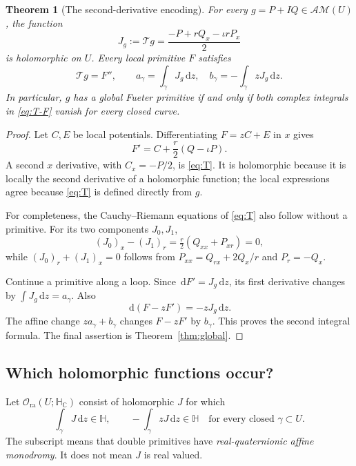 \documentclass[11pt,a4paper]{article}
\numberwithin{equation}{section}
\newtheorem{theorem}{Theorem}[section]
\theoremstyle{definition}
\theoremstyle{remark}
\newcommand{\C}{\mathbb C}
\newcommand{\HH}{\mathbb H}
\newcommand{\HC}{\mathbb H_{\C}}
\newcommand{\AM}{\mathcal{AM}}
\newcommand{\Hol}{\mathcal O}
\newcommand{\dd}{\,\mathrm d}
\newcommand{\T}{\mathcal T}
\begin{document}
\begin{theorem}[The second-derivative encoding]\label{thm:T}
For every $g=P+IQ\in\AM(U)$, the function
\begin{equation}\label{eq:T}
 J_g:=\T g=\frac{-P+rQ_x-\iota rP_x}{2}
\end{equation}
is holomorphic on $U$. Every local primitive $F$ satisfies
\begin{equation}\label{eq:T-F}
 \T g=F'',\qquad
 a_\gamma=\int_\gamma J_g\dd z,\quad
 b_\gamma=-\int_\gamma zJ_g\dd z.
\end{equation}
In particular, $g$ has a global Fueter primitive if and only if both
complex integrals in \eqref{eq:T-F} vanish for every closed curve.
\end{theorem}
\begin{proof}
Let $C,E$ be local potentials. Differentiating $F=zC+E$ in $x$ gives
\begin{equation}\label{eq:Fprime}
 F'=C+\frac r2(Q-\iota P).
\end{equation}
A second $x$ derivative, with $C_x=-P/2$, is \eqref{eq:T}.
It is holomorphic because it is locally the second derivative of a
holomorphic function; the local expressions agree because
\eqref{eq:T} is defined directly from $g$.

For completeness, the Cauchy--Riemann equations of \eqref{eq:T} also
follow without a primitive. For its two components $J_0,J_1$,
\[
 (J_0)_x-(J_1)_r=\tfrac r2(Q_{xx}+P_{xr})=0,
\]
while $(J_0)_r+(J_1)_x=0$ follows from
$P_{xx}=Q_{rx}+2Q_x/r$ and $P_r=-Q_x$.

Continue a primitive along a loop. Since $\dd F'=J_g\dd z$, its first
derivative changes by $\int J_g\dd z=a_\gamma$. Also
\[
 \dd(F-zF')=-zJ_g\dd z.
\]
The affine change $za_\gamma+b_\gamma$ changes $F-zF'$ by $b_\gamma$.
This proves the second integral formula. The final assertion is
Theorem~\ref{thm:global}.
\end{proof}

\subsection{Which holomorphic functions occur?}
Let $\Hol_{\mathrm{ra}}(U;\HC)$ consist of holomorphic $J$ for which
\begin{equation}\label{eq:real-affine-condition}
 \int_\gamma J\dd z\in\HH,\qquad
 -\int_\gamma zJ\dd z\in\HH
 \quad\text{for every closed }\gamma\subset U.
\end{equation}
The subscript means that double primitives have \emph{real-quaternionic
affine monodromy}. It does not mean $J$ is real valued.
\end{document}
